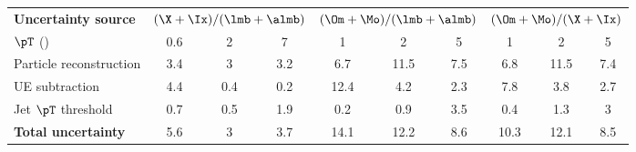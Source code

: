 \documentclass[ALICE,manyauthors]{cernphprep}
\begin{document}
\begin{table}[!ht]
\begin{center}
\begin{tabularx}{\textwidth}{@{} lCCCCCCCCC @{}}
	    	\bottomrule
	    \end{tabularx}
		\begin{tabularx}{\textwidth}{@{} lCCCCCCCCC @{}}
			\toprule
			\textbf{Uncertainty source} & 
			& 
			&  \\
			\cmidrule(lr){2-4} \cmidrule(lr){5-7} \cmidrule(lr){8-10}
			$\pT$ (\GeVc) & 0.6 & 2 &7  & 1 & 2 & 5 & 1 & 2 & 5 \\
			\midrule
			Particle reconstruction& 3.4& 3& 3.2& 6.7& 11.5& 7.5& 6.8& 11.5& 7.4\\
			UE subtraction& 4.4& 0.4& 0.2& 12.4& 4.2& 2.3& 7.8& 3.8& 2.7\\
		    Jet $\pT$ threshold& 0.7& 0.5& 1.9& 0.2& 0.9& 3.5& 0.4& 1.3& 3\\
		    \midrule
		    \textbf{Total uncertainty}& 5.6& 3& 3.7& 14.1& 12.2& 8.6& 10.3& 12.1& 8.5\\
	 	    \bottomrule
	  \end{tabularx}
	\end{center}
\end{table}
\end{document}
